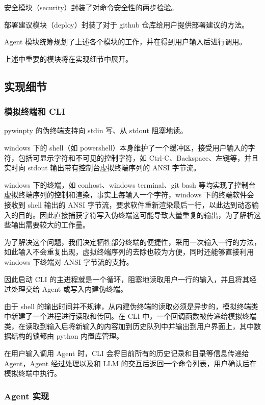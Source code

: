 \documentclass{article}
\theoremstyle{plain}
\theoremstyle{definition}
\theoremstyle{remark}
\begin{document}
安全模块（security）封装了对命令安全性的两步检验。

部署建议模块（deploy）封装了对于 github 仓库给用户提供部署建议的方法。

Agent 模块统筹规划了上述各个模块的工作，并在得到用户输入后进行调用。

上述中重要的模块将在实现细节中展开。

\subsection{实现细节}

\subsubsection{模拟终端和 CLI}

pywinpty 的伪终端支持向 stdin 写、从 stdout 阻塞地读。

windows 下的 shell（如 powershell）本身维护了一个缓冲区，接受用户输入的字符，包括可显示字符和不可见的控制字符，如 Ctrl-C、Backspace、左键等，并且实时向 stdout 输出带有控制台虚拟终端序列的 ANSI 字节流。

windows 下的终端，如 conhost、windows terminal、git bash 等均实现了控制台虚拟终端序列的控制和渲染，事实上每输入一个字符，windows 下的终端软件会接收到 shell 输出的 ANSI 字节流，要求软件重新渲染最后一行，以此达到动态输入的目的。因此直接捕获字符写入伪终端这可能导致大量重复的输出，为了解析这些输出需要较大的工作量。

为了解决这个问题，我们决定牺牲部分终端的便捷性，采用一次输入一行的方法，如此输入不会重复出现，虚拟终端序列的去除也较为方便，同时还能够直接利用 windows 下终端对 ANSI 字节流的支持。

因此启动 CLI 的主进程就是一个循环，阻塞地读取用户一行的输入，并且将其经过处理交给 Agent 或写入内建伪终端。

由于 shell 的输出时间并不规律，从内建伪终端的读取必须是异步的，模拟终端类中新建了一个进程进行读取和传回。在 CLI 中，一个回调函数被传递给模拟终端类，在读取到输入后将新输入的内容加到历史队列中并输出到用户界面上，其中数据结构的锁都由 python 内置库管理。

在用户输入调用 Agent 时，CLI 会将目前所有的历史记录和目录等信息传递给 Agent，Agent 经过处理以及和 LLM 的交互后返回一个命令列表，用户确认后在模拟终端中执行。

\subsubsection{Agent 实现}
\end{document}
